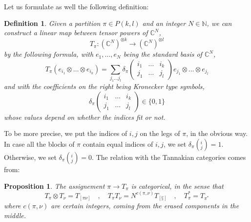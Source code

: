 \documentclass[12pt]{amsbook}
\newtheorem{definition}[theorem]{Definition}
\newtheorem{proposition}[theorem]{Proposition}
\begin{document}
\bigskip

Let us formulate as well the following definition:


\begin{definition}
Given a partition $\pi\in P(k,l)$ and an integer $N\in\mathbb N$, we can construct a linear map between tensor powers of $\mathbb C^N$,
$$T_\pi:(\mathbb C^N)^{\otimes k}\to(\mathbb C^N)^{\otimes l}$$
by the following formula, with $e_1,\ldots,e_N$ being the standard basis of $\mathbb C^N$,
$$T_\pi(e_{i_1}\otimes\ldots\otimes e_{i_k})=\sum_{j_1\ldots j_l}\delta_\pi\begin{pmatrix}i_1&\ldots&i_k\\ j_1&\ldots&j_l\end{pmatrix}e_{j_1}\otimes\ldots\otimes e_{j_l}$$
and with the coefficients on the right being Kronecker type symbols,
$$\delta_\pi\begin{pmatrix}i_1&\ldots&i_k\\ j_1&\ldots&j_l\end{pmatrix}\in\{0,1\}$$
whose values depend on whether the indices fit or not.
\end{definition}

To be more precise, we put the indices of $i,j$ on the legs of $\pi$, in the obvious way. In case all the blocks of $\pi$ contain equal indices of $i,j$, we set $\delta_\pi(^i_j)=1$. Otherwise, we set $\delta_\pi(^i_j)=0$. The relation with the Tannakian categories comes from:

\begin{proposition}
The assignement $\pi\to T_\pi$ is categorical, in the sense that
$$T_\pi\otimes T_\nu=T_{[\pi\nu]}\quad,\quad 
T_\pi T_\nu=N^{c(\pi,\nu)}T_{[^\nu_\pi]}\quad,\quad 
T_\pi^*=T_{\pi^*}$$
where $c(\pi,\nu)$ are certain integers, coming from the erased components in the middle.
\end{proposition}
\end{document}
